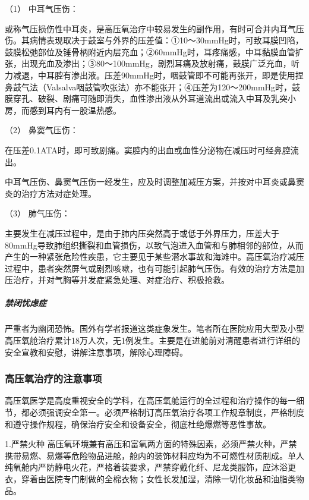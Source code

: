 \hypertarget{text00395.htmlux5cux23CHP16-11-5-3-1}{}
（1） 中耳气压伤：

或称气压损伤性中耳炎，是高压氧治疗中较易发生的副作用，有时可合并内耳气压伤。其病情表现取决于鼓室与外界的压差值：①10～30mmHg时，可致耳膜凹陷，鼓膜松弛部位及锤骨柄附近内层充血；②60mmHg时，耳疼痛感，中耳黏膜血管扩张，出现充血及渗出；③80～100mmHg，剧烈耳痛及放射痛，鼓膜广泛充血，听力减退，中耳腔有渗出液。压差90mmHg时，咽鼓管即不可能再张开，即是使用捏鼻鼓气法（Valsalva咽鼓管吹张法）亦不能张开；④压差为120～200mmHg时，鼓膜穿孔、破裂、剧痛可随即消失，血性渗出液从外耳道流出或流入中耳及乳突小房，而感到耳内有一股温热感。

\hypertarget{text00395.htmlux5cux23CHP16-11-5-3-2}{}
（2） 鼻窦气压伤：

在压差0.1ATA时，即可致剧痛。窦腔内的出血或血性分泌物在减压时可经鼻腔流出。

中耳气压伤、鼻窦气压伤一经发生，应及时调整加减压方案，并按对中耳炎或鼻窦炎的治疗方法对症处理。

\hypertarget{text00395.htmlux5cux23CHP16-11-5-3-3}{}
（3） 肺气压伤：

主要发生在减压过程中，是由于肺内压突然高于或低于外界压力，压差大于80mmHg导致肺组织撕裂和血管损伤，以致气泡进入血管和与肺相邻的部位，从而产生的一种紧张危险性疾患，它主要见于某些潜水事故和海滩中。高压氧治疗减压过程中，患者突然屏气或剧烈咳嗽，也有可能引起肺气压伤。有效的治疗方法是加压治疗，并对气胸等并发症紧急处理、对症治疗、积极抢救。

\subparagraph{禁闭忧虑症}

严重者为幽闭恐怖。国外有学者报道这类症象发生。笔者所在医院应用大型及小型高压氧舱治疗累计18万人次，无1例发生。主要是在进舱前对清醒患者进行详细的安全宣教和安慰，讲解注意事项，解除心理障碍。

\subsubsection{高压氧治疗的注意事项}

高压氧医学是高度重视安全的学科，在高压氧舱运行的全过程和治疗操作的每一细节，都必须强调安全第一。必须严格制订高压氧治疗各项工作规章制度，严格制度和遵守操作规程，确保治疗安全和设备安全，彻底杜绝爆燃等恶性事故。

1.严禁火种
高压氧环境兼有高压和富氧两方面的特殊因素，必须严禁火种，严禁携带易燃、易爆等危险物品进舱，舱内的装饰材料应均为不可燃性材质制成。单人纯氧舱内严防静电火花，严格着装要求，严禁穿戴化纤、尼龙类服饰，应沐浴更衣，穿着由医院专门制做的全棉衣物；女性长发加湿，清除一切化妆品和油脂类物品。

